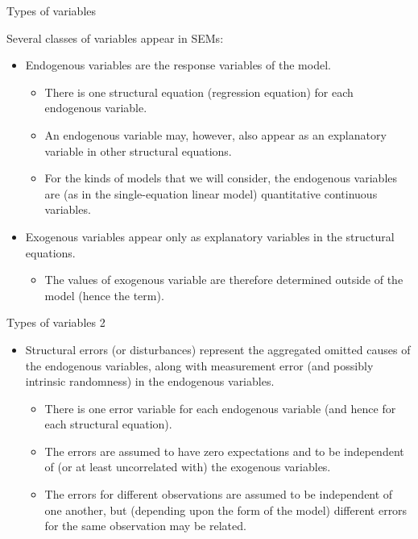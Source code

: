 \documentclass[10pt,ignorenonframetext,]{beamer}
\providecommand{\tightlist}{%
\setlength{\itemsep}{0pt}\setlength{\parskip}{0pt}}
\begin{document}
\begin{frame}{Types of variables}

Several classes of variables appear in SEMs:

\begin{itemize}
\tightlist
\item
  Endogenous variables are the response variables of the model.

  \begin{itemize}
  \tightlist
  \item
    There is one structural equation (regression equation) for each
    endogenous variable.
  \item
    An endogenous variable may, however, also appear as an explanatory
    variable in other structural equations.
  \item
    For the kinds of models that we will consider, the endogenous
    variables are (as in the single-equation linear model) quantitative
    continuous variables.
  \end{itemize}
\item
  Exogenous variables appear only as explanatory variables in the
  structural equations.

  \begin{itemize}
  \tightlist
  \item
    The values of exogenous variable are therefore determined outside of
    the model (hence the term).
  \end{itemize}
\end{itemize}

\end{frame}

\begin{frame}{Types of variables 2}

\begin{itemize}
\tightlist
\item
  Structural errors (or disturbances) represent the aggregated omitted
  causes of the endogenous variables, along with measurement error (and
  possibly intrinsic randomness) in the endogenous variables.

  \begin{itemize}
  \tightlist
  \item
    There is one error variable for each endogenous variable (and hence
    for each structural equation).
  \item
    The errors are assumed to have zero expectations and to be
    independent of (or at least uncorrelated with) the exogenous
    variables.
  \item
    The errors for different observations are assumed to be independent
    of one another, but (depending upon the form of the model) different
    errors for the same observation may be related.
  \end{itemize}
\end{itemize}

\end{frame}
\end{document}

